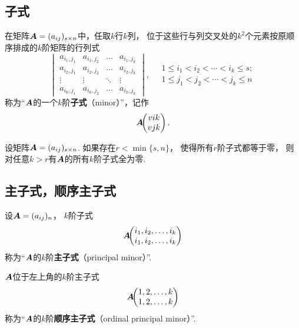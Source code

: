 \subsection{子式}
\begin{definition}
在矩阵\(\boldsymbol{A}=(a_{ij})_{s \times n}\)中，任取\(k\)行\(k\)列，%
位于这些行与列交叉处的\(k^2\)个元素按原顺序排成的\(k\)阶矩阵的行列式\[
\begin{vmatrix}
a_{i_1,j_1} & a_{i_1,j_2} & \dots & a_{i_1,j_k} \\
a_{i_2,j_1} & a_{i_2,j_2} & \dots & a_{i_2,j_k} \\
\vdots & \vdots & \ddots & \vdots \\
a_{i_k,j_1} & a_{i_k,j_2} & \dots & a_{i_k,j_k}
\end{vmatrix}, \quad \begin{array}{c}
1 \leqslant i_1 < i_2 < \dotsb < i_k \leqslant s; \\
1 \leqslant j_1 < j_2 < \dotsb < j_k \leqslant n
\end{array}
\]称为“\(\boldsymbol{A}\)的一个\(k\)阶\textbf{子式}（minor）”，记作\[
\boldsymbol{A}\kern-3.8pt\begin{pmatrix}
	v{i}{k} \\
	v{j}{k}
\end{pmatrix}.
\]
\end{definition}

\begin{property}
设矩阵\(\boldsymbol{A} = (a_{ij})_{s \times n}\).
如果存在\(r < \min\{s,n\}\)，%
使得所有\(r\)阶子式都等于零，%
则对任意\(k > r\)有\(\boldsymbol{A}\)的所有\(k\)阶子式全为零.
\end{property}

\subsection{主子式，顺序主子式}
\begin{definition}
设\(\boldsymbol{A}=(a_{ij})_n\)，%
\(k\)阶子式\[
	\boldsymbol{A}\kern-3.8pt\begin{pmatrix}
		i_1,i_2,\dotsc,i_k \\
		i_1,i_2,\dotsc,i_k
	\end{pmatrix}
\]
称为“\(\boldsymbol{A}\)的\(k\)阶\textbf{主子式}（principal minor）”.

\(\boldsymbol{A}\)位于左上角的\(k\)阶主子式\[
	\boldsymbol{A}\kern-3.8pt\begin{pmatrix}
		1,2,\dotsc,k \\
		1,2,\dotsc,k
	\end{pmatrix}
\]称为“\(\boldsymbol{A}\)的\(k\)阶\textbf{顺序主子式}（ordinal principal minor）”.
\end{definition}

